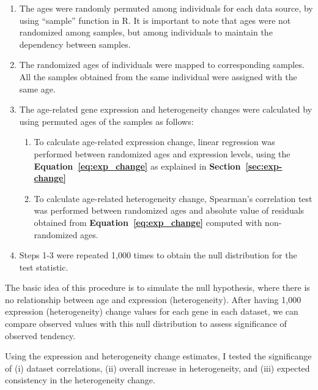 \begin{enumerate}
    \item The ages were randomly permuted among individuals for each data source, by using ``sample'' function in R. 
    It is important to note that ages were not randomized among samples, but among individuals to maintain the dependency between samples.
    \item The randomized ages of individuals were mapped to corresponding samples. All the samples obtained from the same individual were assigned with the same age.
    \item The age-related gene expression and heterogeneity changes were calculated by using permuted ages of the samples as follows:
    \begin{enumerate}
        \item To calculate age-related expression change, linear regression was performed between randomized ages and expression levels, using the \textbf{Equation~\ref{eq:exp_change}} as explained in \textbf{Section~\ref{sec:exp-change}}
        \item To calculate age-related heterogeneity change, Spearman's correlation test was performed between randomized ages and absolute value of residuals obtained from \textbf{Equation~\ref{eq:exp_change}} computed with non-randomized ages.
    \end{enumerate} 
    \item Steps 1-3 were repeated 1,000 times to obtain the null distribution for the test statistic.
\end{enumerate}

The basic idea of this procedure is to simulate the null hypothesis, where there is no relationship between age and expression (heterogeneity).
After having 1,000 expression (heterogeneity) change values for each gene in each dataset, we can compare observed values with this null distribution
to assess significance of observed tendency. 

Using the expression and heterogeneity change estimates, I tested the significange of 
(i) dataset correlations, (ii) overall increase in heterogeneity, and (iii) expected consistency in the heterogeneity change.

